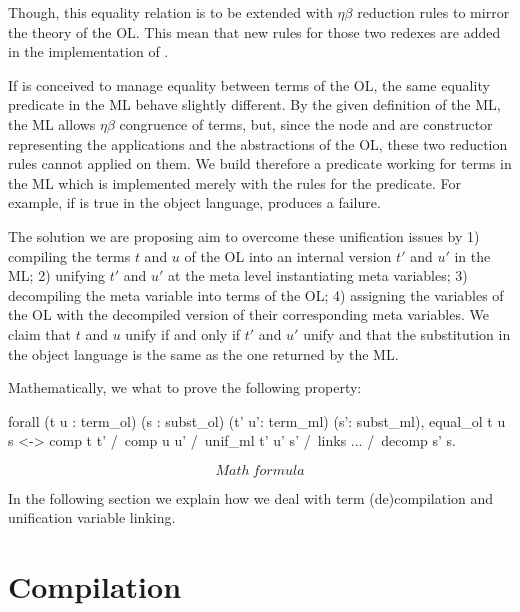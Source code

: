 \documentclass[sigconf,natbib=false]{acmart}
\begin{document}
Though, this equality relation is to be extended with $\eta\beta$ reduction
rules to mirror the theory of the OL. This mean
that new rules for those two redexes are added in the implementation of
.

If  is conceived to manage equality between terms of the OL,
the same equality predicate in the ML behave slightly different. By the given
definition of the ML, the ML allows $\eta\beta$ congruence of terms, but, since
the node  and  are constructor representing the
applications and the abstractions of the OL, these two reduction rules cannot
applied on them. We build therefore a predicate  working for terms
in the ML which is implemented merely with the rules for the 
predicate. For example, if  is true in the object language,  produces a failure.

The solution we are proposing aim to overcome these unification issues by 1)
compiling the terms $t$ and $u$ of the OL into an internal version $t'$ and $u'$
in the ML; 2) unifying $t'$ and $u'$ at the meta level instantiating meta
variables; 3) decompiling the meta variable into terms of the OL; 4) assigning
the variables of the OL with the decompiled version of their corresponding meta
variables. We claim that $t$ and $u$ unify if and only if $t'$ and $u'$ unify
and that the substitution in the object language is the same as the one returned
by the ML.  

Mathematically, we what to prove the following property:

\begin{coqcode}
  forall (t  u : term_ol) (s : subst_ol) 
         (t' u': term_ml) (s': subst_ml), 
    equal_ol t u s <->
      comp t t' /\ comp u u' /\ 
      unif_ml t' u' s' /\ links ... /\ decomp s' s.
\end{coqcode}

$$Math\ formula$$

In the following section we explain how we deal with term (de)compilation and
unification variable linking.

\section[Compilation: fo\_tm to tm]{Compilation}
\end{document}

